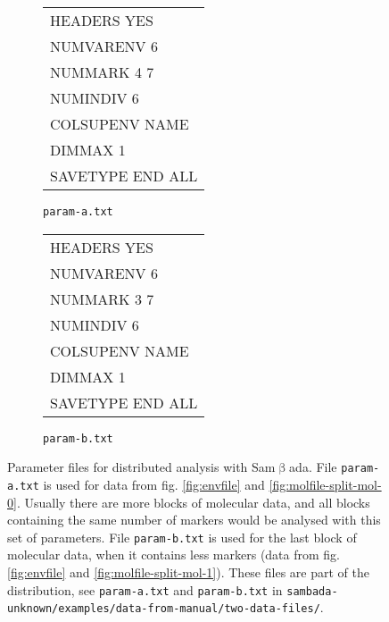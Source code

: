 \documentclass[a4paper,11pt]{article}
\newcommand{\versionnumber}{unknown}
\newcommand{\smb}{\textsf{Sam$\upbeta$ada}}
\newcommand{\pathtodatafrommanual}{\texttt{sambada-\versionnumber/examples/data-from-manual/}}
\newcommand{\pathtotwodatafiles}{\pathtodatafrommanual\texttt{two-data-files/}}
\begin{document}
\begin{figure}[htbp]
\centering

\hfill%
\begin{subfigure}{6cm}
\centering
\ttfamily
\begin{tabular}{|l|}
\hline
HEADERS YES\\	
NUMVARENV 6\\	
NUMMARK 4 7	\\
NUMINDIV 6\\
COLSUPENV NAME\\
DIMMAX 1\\
SAVETYPE END ALL\\
\hline
\end{tabular}%
\caption{\texttt{param-a.txt}}
\label{fig:fichier-param-parallele-a}
\end{subfigure}%
\hfill%
\begin{subfigure}{6cm}
\centering
\ttfamily
\begin{tabular}{|l|}
\hline
HEADERS YES\\	
NUMVARENV 6\\	
NUMMARK 3 7	\\
NUMINDIV 6\\
COLSUPENV NAME\\
DIMMAX 1\\
SAVETYPE END ALL\\
\hline
\end{tabular}%
\caption{\texttt{param-b.txt}}
\label{fig:fichier-param-parallele-b}
\end{subfigure}%
\hfill

\caption[Exemple de fichier de paramètres pour \smb.]
{
	Parameter files for distributed analysis with \smb.
	File \texttt{param-a.txt} is used for data from fig. \ref{fig:envfile} and \ref{fig:molfile-split-mol-0}.
	Usually there are more blocks of molecular data, and all blocks containing the same number of markers would be analysed with this set of parameters.
	File \texttt{param-b.txt} is used for the last block of molecular data, when it contains less markers (data from fig. \ref{fig:envfile} and \ref{fig:molfile-split-mol-1}).
	These files are part of the distribution, see \texttt{param-a.txt} and \texttt{param-b.txt} in \pathtotwodatafiles.
}
\label{fig:fichier-param-parallele}
\end{figure}
\end{document}
